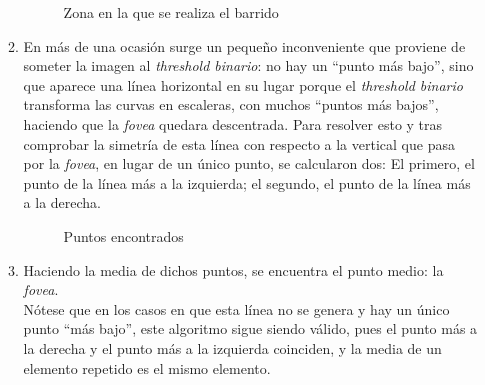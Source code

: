 \begin{enumerate}
\begin{enumerate}[label*=\arabic*.]
    \begin{figure}[H]
      \caption{Zona en la que se realiza el barrido}
      \centering \setlength\fboxsep{0pt} \setlength\fboxrule{0.5pt}
    \end{figure}

  \item En más de una ocasión surge un pequeño inconveniente que
    proviene de someter la imagen al \emph{threshold binario}: no hay
    un ``punto más bajo'', sino que aparece una línea horizontal en su
    lugar porque el \emph{threshold binario} transforma las curvas en
    escaleras, con muchos ``puntos más bajos'', haciendo que la
    \emph{\gls{fovea}} quedara descentrada. Para resolver esto y tras
    comprobar la simetría de esta línea con respecto a la vertical que
    pasa por la \emph{\gls{fovea}}, en lugar de un único punto, se
    calcularon dos: El primero, el punto de la línea más a la
    izquierda; el segundo, el punto de la línea más a la derecha.

    \begin{figure}[H]
      \caption{Puntos encontrados}
      \centering \setlength\fboxsep{0pt} \setlength\fboxrule{0.5pt}
    \end{figure}

  \item Haciendo la media de dichos
    puntos, se encuentra el punto medio: la \emph{\gls{fovea}}. \\
    Nótese que en los casos en que esta línea no se genera y hay un
    único punto ``más bajo'', este algoritmo sigue siendo válido, pues
    el punto más a la derecha y el punto más a la izquierda coinciden,
    y la media de un elemento repetido es el mismo elemento.


\end{enumerate}
\end{enumerate}
